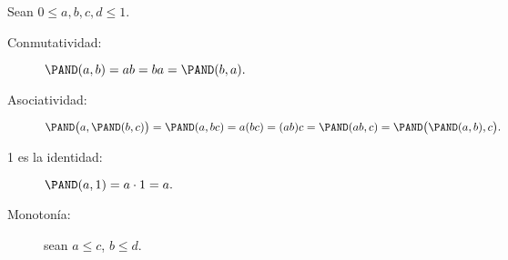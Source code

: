 
Sean \(0 ≤ a, b, c, d ≤ 1\).
\begin{description}
  \item[Conmutatividad:]
    \(
      \PAND(a, b) =
      ab =
      ba =
      \PAND(b, a).
    \)
  \item[Asociatividad:]
    \(
      \PAND\bigl(a, \PAND(b, c)\bigr) =
      \PAND(a, bc) =
      a(bc) =
      (ab)c =
      \PAND(ab, c) =
      \PAND\bigl(\PAND(a, b), c\bigr).
    \)
  \item[1 es la identidad:]
    \(
      \PAND(a, 1) = a\cdot 1 = a.
    \)
  \item[Monotonía:] sean \(a ≤ c\), \(b ≤ d\).

\end{description}


